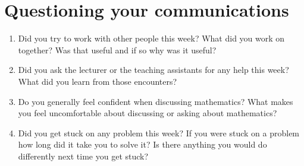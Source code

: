 \documentclass[a4paper]{article}
\begin{document}
\section*{Questioning your communications}

\begin{enumerate}

\item Did you try to work with other people this week?  What did you work on together?  Was that useful and if so why was it useful?

\item Did you ask the lecturer or the teaching assistants for any help this week?  What did you learn from those encounters?

\item Do you generally feel confident when discussing mathematics?  What makes you feel uncomfortable about discussing or asking about mathematics?

\item Did you get stuck on any problem this week?  If you were stuck on a problem how long did it take you to solve it?  Is there anything you would do differently next time you get stuck? 

\end{enumerate}
\end{document}
